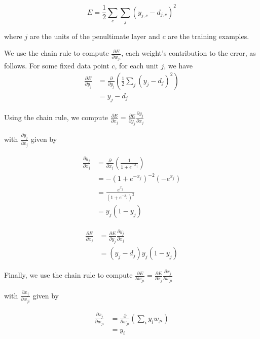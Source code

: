 \documentclass[10pt]{article}
\begin{document}
$$ E = \frac{1}{2}\sum_{c} \sum_{j} (y_{j, c} - d_{j, c})^2$$

where $j$ are the units of the penultimate layer and $c$ are the training examples.

We use the chain rule to compute $\frac{\partial E}{\partial w_{ji}}$, each weight's contribution to the error, as follows.
For some fixed data point $c$, for each unit $j$, we have
\begin{align}
    \frac{\partial E}{\partial y_{j}} & = \frac{\partial}{\partial y_j} \left( \frac{1}{2} \sum_{j} (y_{j} - d_{j})^2 \right) \\
                                      & = y_j - d_j
\end{align}

Using the chain rule, we compute $ \frac{\partial E}{\partial x_{j}} = \frac{\partial E}{\partial y_{j}} \frac{\partial y_j}{\partial x_{j}}$

with $\frac{\partial y_j}{\partial x_{j}}$ given by

\begin{align}
    \frac{\partial y_j}{\partial x_{j}} & = \frac{\partial}{\partial x_{j}} \left( \frac{1}{1 + e^{-x_j}} \right) \\
                                        & = -(1 + e^{-x_j})^{-2}(-e^{x_j})                                        \\
                                        & = \frac{ e^{x_j}}{(1 + e^{-x_j})^{2}}                                   \\
                                        & = y_j (1-y_j)
\end{align}

\begin{align}
    \frac{\partial E}{\partial x_{j}} & = \frac{\partial E}{\partial y_{j}} \frac{\partial y_j}{\partial x_{j}} \\
                                      & = (y_j - d_j) y_j(1-y_j)
\end{align}

Finally, we use the chain rule to compute $\frac{\partial E}{\partial w_{ji}} = \frac{\partial E}{\partial x_{j}} \frac{\partial x_j}{\partial w_{ji}}$

with $\frac{\partial x_j}{\partial w_{ji}}$ given by

\begin{align}
    \frac{\partial x_j}{\partial w_{ji}} & = \frac{\partial}{\partial w_{ji}} \left( \sum_{i}y_{i}w_{ji} \right) \\
                                         & = y_{i}
\end{align}
\end{document}
